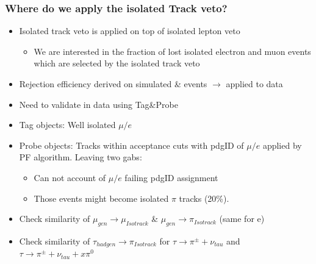 \documentclass{beamer}
\begin{document}
\begin{frame}
 \frametitle{Where do we apply the isolated Track veto?}
 \begin{itemize}
  \item Isolated track veto is applied on top of isolated lepton veto
  \begin{itemize}
   \item We are interested in the fraction of lost isolated electron and muon events which are selected by the isolated track veto
  \end{itemize}
  \item Rejection efficiency derived on simulated \ttbar \& \wpj events $\rightarrow$ applied to data
  \item Need to validate in data using Tag\&Probe
  \item Tag objects: Well isolated $\mu/e$
  \item Probe objects: Tracks within acceptance cuts with pdgID of $\mu/e$ applied by PF algorithm. Leaving two gabs:
  \begin{itemize}
   \item Can not account of  $\mu/e$  failing pdgID assignment
   \item Those events might become isolated $\pi$ tracks (20\%).
  \end{itemize}
  \item Check similarity of $\mu_{gen}\rightarrow \mu_{Isotrack}$ \& $\mu_{gen}\rightarrow \pi_{Isotrack}$ (same for e)
  \item Check similarity of $ \tau_{had gen}\rightarrow \pi_{Isotrack}$ for $\tau\rightarrow\pi^{\pm}+\nu_{tau}$ and $\tau\rightarrow\pi^{\pm}+\nu_{tau}+x\pi^{0}$
 \end{itemize}
\end{frame}
\end{document}
